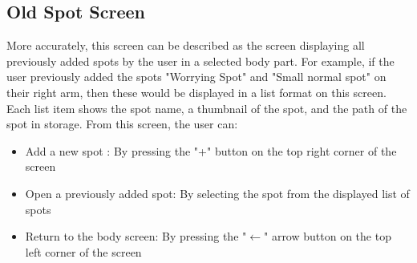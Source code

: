\subsection{Old Spot Screen} \label{sec:oldspotscreen}
More accurately, this screen can be described as the screen displaying all previously added spots by the user in a selected body part. For example, if the user previously added the spots "Worrying Spot" and "Small normal spot" on their right arm, then these would be displayed in a list format on this screen. Each list item shows the spot name, a thumbnail of the spot, and the path of the spot in storage. From this screen, the user can:
\begin{itemize}
\item Add a new spot : By pressing the "+" button on the top right corner of the screen
\item Open a previously added spot: By selecting the spot from the displayed list of spots
\item Return to the body screen: By pressing the "$\leftarrow$" arrow button on the top left corner of the screen
\end{itemize}

